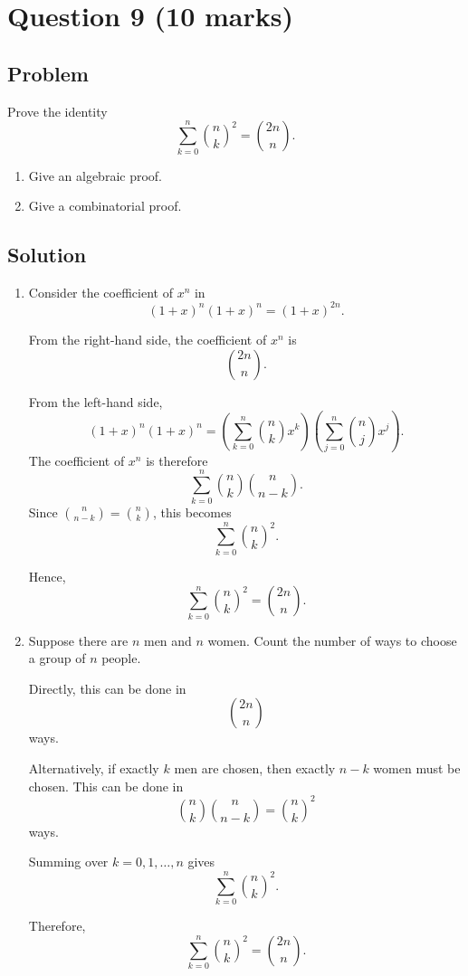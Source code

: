 \documentclass[12pt]{article}
\begin{document}
\newpage
\section{Question 9 \hfill (10 marks)}
\subsection{Problem}

Prove the identity
\[
\sum_{k=0}^{n} \binom{n}{k}^{2}=\binom{2n}{n}.
\]

\begin{enumerate}[label=(\alph*)]
    \item Give an algebraic proof.
    \item Give a combinatorial proof.
\end{enumerate}

\subsection{Solution}

\begin{enumerate}[label=(\alph*)]
    \item Consider the coefficient of $x^n$ in
    \[
    (1+x)^n(1+x)^n=(1+x)^{2n}.
    \]

    From the right-hand side, the coefficient of $x^n$ is
    \[
    \binom{2n}{n}.
    \]

    From the left-hand side,
    \[
    (1+x)^n(1+x)^n
    =\left(\sum_{k=0}^{n}\binom{n}{k}x^k\right)
    \left(\sum_{j=0}^{n}\binom{n}{j}x^j\right).
    \]
    The coefficient of $x^n$ is therefore
    \[
    \sum_{k=0}^{n}\binom{n}{k}\binom{n}{n-k}.
    \]
    Since $\binom{n}{n-k}=\binom{n}{k}$, this becomes
    \[
    \sum_{k=0}^{n}\binom{n}{k}^2.
    \]

    Hence,
    \[
    \boxed{\sum_{k=0}^{n}\binom{n}{k}^{2}=\binom{2n}{n}}.
    \]

    \item Suppose there are $n$ men and $n$ women. Count the number of ways to choose a group of $n$ people.

    Directly, this can be done in
    \[
    \binom{2n}{n}
    \]
    ways.

    Alternatively, if exactly $k$ men are chosen, then exactly $n-k$ women must be chosen. This can be done in
    \[
    \binom{n}{k}\binom{n}{n-k}=\binom{n}{k}^2
    \]
    ways.

    Summing over $k=0,1,\dots,n$ gives
    \[
    \sum_{k=0}^{n}\binom{n}{k}^2.
    \]

    Therefore,
    \[
    \boxed{\sum_{k=0}^{n}\binom{n}{k}^{2}=\binom{2n}{n}}.
    \]
\end{enumerate}
\end{document}
